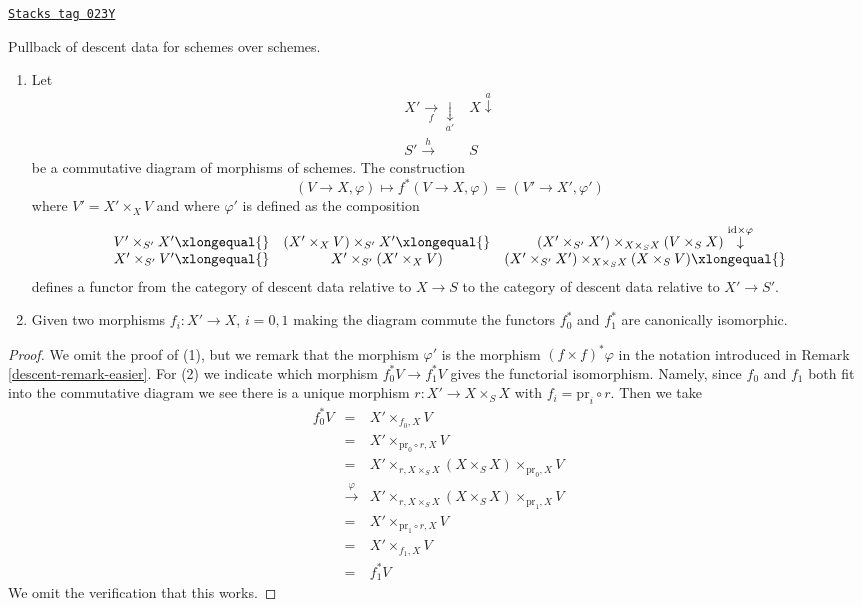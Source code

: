 \begin{lemma}[Pullback]
\label{descent-lemma-pullback}
\href{https://stacks.math.columbia.edu/tag/023Y}{\texttt{Stacks tag 023Y}}

Pullback of descent data for schemes over schemes.
\begin{enumerate}
\item Let
$$
\begin{array}{cc}X' \underset{f}{\longrightarrow}\underset{a'}{\downarrow} & X \overset{a}{\downarrow} \\ S' \overset{h}{\longrightarrow} & S\end{array}
$$
be a commutative diagram of morphisms of schemes.
The construction
$$
(V \to X, \varphi) \longmapsto f^*(V \to X, \varphi) = (V' \to X', \varphi')
$$
where $V' = X' \times_X V$ and where
$\varphi'$ is defined as the composition
$$
\begin{array}{ccc}V' \times_{S'} X' \xlongequal{} & (X' \times_X V) \times_{S'} X' \xlongequal{} & (X' \times_{S'} X') \times_{X \times_S X} (V \times_S X)
\overset{\text{id} \times \varphi}{\downarrow} \\ X' \times_{S'} V' \xlongequal{} & X' \times_{S'} (X' \times_X V) & (X' \times_{S'} X') \times_{X \times_S X} (X \times_S V) \xlongequal{}\end{array}
$$
defines a functor from the category of descent data
relative to $X \to S$ to the category of descent data
relative to $X' \to S'$.
\item Given two morphisms $f_i : X' \to X$, $i = 0, 1$ making the
diagram commute the functors $f_0^*$ and $f_1^*$ are
canonically isomorphic.
\end{enumerate}
\end{lemma}

\begin{proof}

We omit the proof of (1), but we remark that the morphism
$\varphi'$ is the morphism $(f \times f)^*\varphi$ in the
notation introduced in Remark \ref{descent-remark-easier}.
For (2) we indicate which morphism
$f_0^*V \to f_1^*V$ gives the functorial isomorphism. Namely,
since $f_0$ and $f_1$ both fit into the commutative diagram
we see there is a unique morphism $r : X' \to X \times_S X$
with $f_i = \text{pr}_i \circ r$. Then we take
\begin{eqnarray*}
f_0^*V & = &
X' \times_{f_0, X} V \\
& = &
X' \times_{\text{pr}_0 \circ r, X} V \\
& = &
X' \times_{r, X \times_S X} (X \times_S X) \times_{\text{pr}_0, X} V \\
& \xrightarrow{\varphi} &
X' \times_{r, X \times_S X} (X \times_S X) \times_{\text{pr}_1, X} V \\
& = &
X' \times_{\text{pr}_1 \circ r, X} V \\
& = &
X' \times_{f_1, X} V \\
& = & f_1^*V
\end{eqnarray*}
We omit the verification that this works.
\end{proof}

